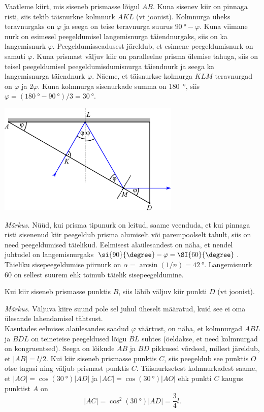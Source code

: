 \documentclass[11pt, twoside]{article}
\begin{document}
{{\osa Vaatleme kiirt, mis siseneb prismasse lõigul $AB$. Kuna sisenev kiir on pinnaga risti, siis tekib täisnurkne kolmnurk $AKL$ (vt joonist). Kolmnurga üheks teravnurgaks on $\varphi$ ja seega on teise teravnurga suurus $\SI{90}{\degree}-\varphi$. Kuna viimane nurk on esimesel peegeldumisel langemisnurga täiendnurgaks, siis on ka langemisnurk $\varphi$. Peegeldumisseadusest järeldub, et esimene peegeldumisnurk on samuti $\varphi$. Kuna prismast väljuv kiir on paralleelne prisma ülemise tahuga, siis on teisel peegeldumisel peegeldumisdumisnurga täiendnurk ja seega ka langemisnurga täiendnurk $\varphi$. Näeme, et täisnurkse kolmurga $KLM$ teravnurgad on $\varphi$ ja $2\varphi$. Kuna kolmnurga sisenurkade summa on \SI{180}{\degree}, siis $\varphi=(\SI{180}{\degree}-\SI{90}{\degree})/3=\SI{30}{\degree}$.

\begin{center}
 \includegraphics[width=0.65\textwidth]{2014-v3g-04-periskoopprillid_lahendus_joonis2.pdf}
\end{center}

\emph{Märkus.} Nüüd, kui prisma tipunurk on leitud, saame veenduda, et kui pinnaga risti sisenenud kiir peegeldub prisma alumiselt või parempoolselt tahult, siis on need peegeldumised täielikud. Eelmisest alaülesandest on näha, et nendel juhtudel on langemisnurgaks $\si{90}{\degree}-\varphi=\SI{60}{\degree}$. Täieliku sisepeegeldumise piirnurk on $\alpha=\arcsin(1/n)=\SI{42}{\degree}$. Langemisnurk \si{60}{\degree} on sellest suurem ehk toimub täielik sisepeegeldumine.

\osa Kui kiir siseneb prismasse punktis $B$, siis läbib väljuv kiir punkti $D$ (vt joonist).

\emph{Märkus.} Väljuva kiire suund pole sel juhul üheselt määratud, kuid see ei oma ülesande lahendamisel tähtsust.\\
Kasutades eelmises alaülesandes saadud $\varphi$ väärtust, on näha, et kolmnurgad $ABL$ ja $BDL$ on teineteise peegeldused lõigu $BL$ suhtes (öeldakse, et need kolmnurgad on kongruentsed). Seega on lõikude $AB$ ja $BD$ pikkused võrdsed, millest järeldub, et $|AB|=l/2$. Kui kiir siseneb prismasse punktis $C$, siis peegeldub see punktis $O$ otse tagasi ning väljub prismast punktis $C$. Täisnurksetest kolmnurkadest saame, et $|AO|=\cos(\SI{30}{\degree})|AD|$ ja $|AC|=\cos(\SI{30}{\degree})|AO|$ ehk punkti $C$ kaugus punktist $A$ on 
\[
|AC|=\cos^2(\SI{30}{\degree})|AD|=\frac{3}{4}l.
\]

}}
\end{document}
